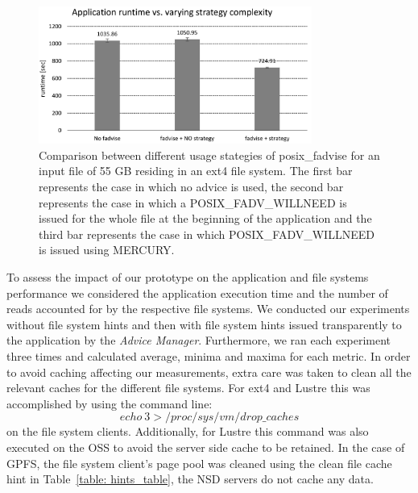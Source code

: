 \begin{figure}[!htb]
  \centering
  \includegraphics[width=0.8\textwidth]{chapters/chapter2/figures/SC2015/ROOT/separate_plots/test_cluster/test_fadvise_no_border}
  \caption{Comparison between different usage stategies of posix\_fadvise for an input file of 55 GB residing in an ext4 file system. The first bar represents the case in which no advice is used, the second bar represents the case in which a POSIX\_FADV\_WILLNEED is issued for the whole file at the beginning of the application and the third bar represents the case in which POSIX\_FADV\_WILLNEED is issued using MERCURY.}
  \label{figure: fadvise_comparison}
\end{figure} 
 
To assess the impact of our prototype on the application and file systems performance we considered the application execution time and the number of reads accounted for by the respective file systems. We conducted our experiments without file system hints and then with file system hints issued transparently to the application by the \textit{Advice Manager}. Furthermore, we ran each experiment three times and calculated average, minima and maxima for each metric. In order to avoid caching affecting our measurements, extra care was taken to clean all the relevant caches for the different file systems. For ext4 and Lustre this was accomplished by using the command line: $$echo\ 3 > /proc/sys/vm/drop\_caches$$ on the file system clients. Additionally, for Lustre this command was also executed on the OSS to avoid the server side cache to be retained. In the case of GPFS, the file system client's page pool was cleaned using the clean file cache hint in Table~\ref{table: hints_table}, the NSD servers do not cache any data. 

